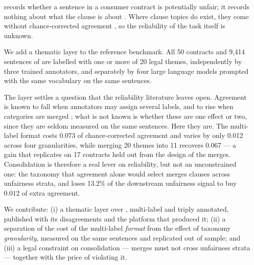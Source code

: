 \corpus{} records whether a sentence in a consumer contract is potentially unfair;
it records nothing about what the clause is about \cite{lippi2019claudette,
lagioia2019deep}. Where clause topics do exist, they come without
chance-corrected agreement \cite{braun2022topics,loffler2025chilean}, so the
reliability of the task itself is unknown.

We add a thematic layer to the reference benchmark. All 50 contracts and
9,414 sentences of \corpus{} are labelled with one or more of 20 legal themes,
independently by three trained annotators, and separately by four large language
models prompted with the same vocabulary on the same sentences.

The layer settles a question that the reliability literature leaves open. Agreement
is known to fall when annotators may assign several labels, and to rise when
categories are merged \cite{bayerl2011metaanalysis,marchal2022multilabel}; what is
not known is whether these are one effect or two, since they are seldom measured
on the same sentences. Here they are. The multi-label format costs
$0.073$ of chance-corrected agreement and varies by only 0.012 across four
granularities, while merging 20 themes into 11 recovers $0.067$ --- a gain that
replicates on 17 contracts held out from the design of the merges. Consolidation is therefore a real lever on reliability, but
not an unconstrained one: the taxonomy that agreement alone would select merges
clauses across unfairness strata, and loses 13.2\% of the downstream unfairness
signal to buy $0.012$ of extra agreement.

We contribute: (i) a thematic layer over \corpus{}, multi-label and triply
annotated, published with its disagreements and the platform that produced it;
(ii) a separation of the cost of the multi-label \emph{format} from
the effect of taxonomy \emph{granularity}, measured on the same sentences and
replicated out of sample; and (iii) a legal constraint on consolidation --- merges
must not cross unfairness strata --- together with the price of violating it.
